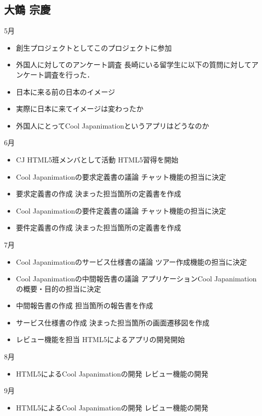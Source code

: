 \subsection{大鶴 宗慶}
5月
\begin{itemize}
\item 創生プロジェクトとしてこのプロジェクトに参加
\item 外国人に対してのアンケート調査
	長崎にいる留学生に以下の質問に対してアンケート調査を行った．
	\item 日本に来る前の日本のイメージ
	\item 実際に日本に来てイメージは変わったか
	\item 外国人にとってCool Japanimationというアプリはどうなのか
\end{itemize}
\par
6月
\begin{itemize}
\item CJ HTML5班メンバとして活動
	HTML5習得を開始
\item Cool Japanimationの要求定義書の議論
	チャット機能の担当に決定
\item 要求定義書の作成
	決まった担当箇所の定義書を作成
\item Cool Japanimationの要件定義書の議論
	チャット機能の担当に決定
\item 要件定義書の作成
	決まった担当箇所の定義書を作成
\end{itemize}
\par
7月
\begin{itemize}
\item Cool Japanimationのサービス仕様書の議論
	ツアー作成機能の担当に決定
\item Cool Japanimationの中間報告書の議論
	アプリケーションCool Japanimationの概要・目的の担当に決定
\item 中間報告書の作成
	担当箇所の報告書を作成
\item サービス仕様書の作成
	決まった担当箇所の画面遷移図を作成
\item レビュー機能を担当
	HTML5によるアプリの開発開始
\end{itemize}
\par
8月
\begin{itemize}
\item HTML5によるCool Japanimationの開発
	レビュー機能の開発
\end{itemize}
\par
9月
\begin{itemize}
\item HTML5によるCool Japanimationの開発
	レビュー機能の開発
\end{itemize}
